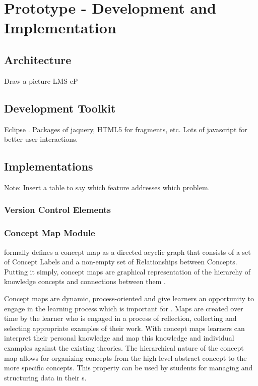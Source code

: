 \chapter{Prototype - Development and Implementation\label{cha:prototype}}

\section{Architecture}

Draw a picture LMS eP

\section{Development Toolkit}

Eclipse . Packages of jaquery, HTML5 for fragments, etc. Lots of javascript for
better user interactions.

\section{Implementations}

Note: Insert a table to say which feature addresses which problem.

\subsection{Version Control Elements}

\subsection{Concept Map Module}
\citet{Mcaleese1998} formally defines a concept map as a directed
acyclic graph that consists of a set of Concept Labels and a non-empty set of
Relationships between Concepts. Putting it simply, concept maps are graphical
representation of the hierarchy of knowledge concepts and connections between
them \citep{Novak2008}.

Concept maps are dynamic, process-oriented and give learners an opportunity to
engage in the learning process \citep{Mcaleese1998} which is important for \LLLs 
\citep{Schuetze2006,Divjak2004}. Maps are created over time by the learner who is
engaged in a process of reflection, collecting and selecting appropriate examples of their
work. With concept maps learners can interpret their personal knowledge and map
this knowledge and individual examples against the existing theories. The
hierarchical nature of the concept map allows for organizing concepts from the
high level abstract concept to the more specific concepts. This property can be
used by students for managing and structuring data in their \ep s.

